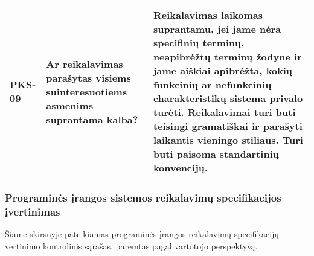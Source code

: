 \documentclass{VUMIFPSkursinis}
\begin{document}
\begin{center}
\begin{longtable}{|C{2cm}|L{5cm}|L{8cm}|}
		PKS-09                                                                        &
		Ar reikalavimas parašytas visiems suinteresuotiems asmenims suprantama kalba? &
		Reikalavimas laikomas suprantamu, jei jame nėra specifinių terminų, neapibrėžtų terminų žodyne ir jame aiškiai apibrėžta, kokių funkcinių ar nefunkcinių charakteristikų sistema privalo turėti. Reikalavimai turi būti teisingi gramatiškai ir parašyti laikantis vieningo stiliaus. Turi būti paisoma standartinių konvencijų.                                                                                                              \\ \hline
	\end{longtable}
\end{center}

\subsubsection{Programinės įrangos sistemos reikalavimų specifikacijos įvertinimas}

Šiame skirsnyje pateikiamas programinės įrangos reikalavimų specifikacijų vertinimo kontrolinis sąrašas, paremtas pagal vartotojo perspektyvą.
\end{document}
